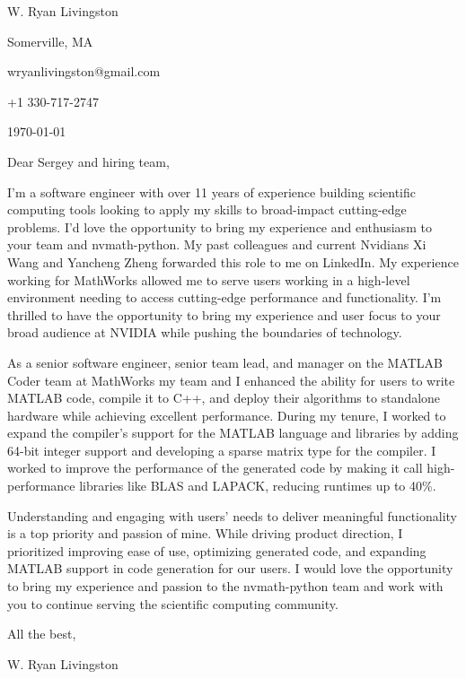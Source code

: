 \documentclass[
    10pt %
]{article}
\begin{document}
\begin{minipage}{\linewidth}
W. Ryan Livingston

Somerville, MA

wryanlivingston@gmail.com

+1 330-717-2747

\today
\end{minipage}

Dear Sergey and hiring team,

I'm a software engineer with over 11 years of experience building scientific computing tools looking to apply my skills to broad-impact cutting-edge problems. I'd love the opportunity to bring my experience and enthusiasm to your team and nvmath-python.
My past colleagues and current Nvidians Xi Wang and Yancheng Zheng forwarded this role to me on LinkedIn. My experience working for MathWorks allowed me to serve users working in a high-level environment needing to access cutting-edge performance and functionality. I'm thrilled to have the opportunity to bring my experience and user focus to your broad audience at NVIDIA while pushing the boundaries of technology.

As a senior software engineer, senior team lead, and manager on the MATLAB Coder team at MathWorks my team and I enhanced the ability for users to write MATLAB code, compile it to C++, and deploy their algorithms to standalone hardware while achieving excellent performance. During my tenure, I worked to expand the compiler's support for the MATLAB language and libraries by adding 64-bit integer support and developing a sparse matrix type for the compiler. I worked to improve the performance of the generated code by making it call high-performance libraries like BLAS and LAPACK, reducing runtimes up to 40\%.

Understanding and engaging with users' needs to deliver meaningful functionality is a top priority and passion of mine. While driving product direction, I prioritized improving ease of use, optimizing generated code, and expanding MATLAB support in code generation for our users. I would love the opportunity to bring my experience and passion to the nvmath-python team and work with you to continue serving the scientific computing community.

All the best,

W. Ryan Livingston
\end{document}
